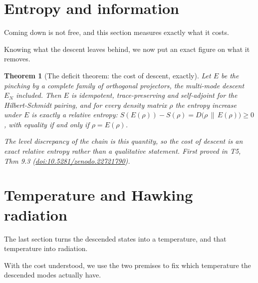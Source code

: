 \documentclass[11pt]{article}
\newtheorem{theorem}{Theorem}[section]
\theoremstyle{definition}
\theoremstyle{plain}
\providecommand{\EN}{}\renewcommand{\EN}{E_{N}}
\providecommand{\rel}{}\renewcommand{\rel}[2]{D\bigl(#1 \,\|\, #2\bigr)}
\begin{document}
\section{Entropy and information}

Coming down is not free, and this section measures exactly what it costs.

Knowing what the descent leaves behind, we now put an exact figure on what it removes.

\begin{theorem}[The deficit theorem: the cost of descent, exactly]\label{c:singularity.deficit-theorem-cost-descent-exactly}
Let $E$ be the pinching by a complete family of orthogonal projectors, the multi-mode descent $\EN$ included. Then $E$ is idempotent, trace-preserving and self-adjoint for the Hilbert-Schmidt pairing, and for every density matrix $\rho$ the entropy increase under $E$ is exactly a relative entropy: $S(E(\rho)) - S(\rho) = \rel{\rho}{E(\rho)} \geq 0$, with equality if and only if $\rho = E(\rho)$.

The level discrepancy of the chain is this quantity, so the cost of descent is an exact relative entropy rather than a qualitative statement.
\emph{First proved in} T5, Thm 9.3 (\href{https://doi.org/10.5281/zenodo.22721790}{doi:10.5281/zenodo.22721790}).
\end{theorem}

\section{Temperature and Hawking radiation}

The last section turns the descended states into a temperature, and that temperature into radiation.

With the cost understood, we use the two premises to fix which temperature the descended modes actually have.
\end{document}
